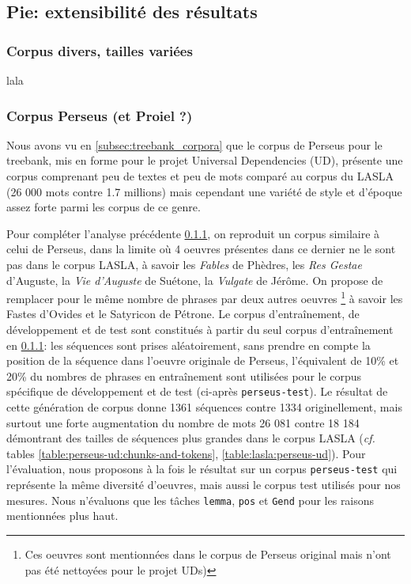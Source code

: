 \subsection{Pie: extensibilité des résultats}

\subsubsection{Corpus divers, tailles variées}
\label{lemmatisation:extensibilite:tailles}

lala

\subsubsection{Corpus Perseus (et Proiel ?)}
\label{lemmatisation:extensibilite:perseus}

Nous avons vu en \ref{subsec:treebank_corpora} que le corpus de Perseus pour le treebank, mis en forme pour le projet Universal Dependencies (\Gls{UD}), présente une corpus comprenant peu de textes et peu de mots comparé au corpus du LASLA (26 000 mots contre 1.7 millions) mais cependant une variété de style et d'époque assez forte parmi les corpus de ce genre.

\newpara

Pour compléter l'analyse précédente \ref{lemmatisation:extensibilite:tailles}, on reproduit un corpus similaire à celui de Perseus, dans la limite où 4 oeuvres présentes dans ce dernier ne le sont pas dans le corpus LASLA, à savoir les \textit{Fables} de Phèdres, les \textit{Res Gestae} d'Auguste, la \textit{Vie d'Auguste} de Suétone, la \textit{Vulgate} de Jérôme. On propose de remplacer pour le même nombre de phrases par deux autres oeuvres \footnote{Ces oeuvres sont mentionnées dans le corpus de Perseus original mais n'ont pas été nettoyées pour le projet \Glspl{UD})} à savoir les Fastes d'Ovides et le Satyricon de Pétrone. Le corpus d'entraînement, de développement et de test sont constitués à partir du seul corpus d'entraînement en \ref{lemmatisation:extensibilite:tailles}: les séquences sont prises aléatoirement, sans prendre en compte la position de la séquence dans l'oeuvre originale de Perseus, l'équivalent de 10\% et 20\% du nombres de phrases en entraînement sont utilisées pour le corpus spécifique de développement et de test (ci-après \texttt{perseus-test}). Le résultat de cette génération de corpus donne 1361 séquences contre 1334 originellement, mais surtout une forte augmentation du nombre de mots 26 081 contre 18 184 démontrant des tailles de séquences plus grandes dans le corpus LASLA (\textit{cf.} tables \ref{table:perseus-ud:chunks-and-tokens}, \ref{table:lasla:perseus-ud}).  Pour l'évaluation, nous proposons à la fois le résultat sur un corpus \texttt{perseus-test} qui représente la même diversité d'oeuvres, mais aussi le corpus test utilisés pour nos mesures. Nous n'évaluons que les tâches \texttt{lemma}, \texttt{pos} et \texttt{Gend} pour les raisons mentionnées plus haut. 

